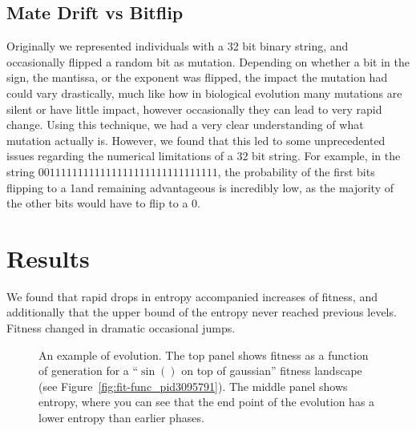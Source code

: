 \documentclass[11pt]{article}
\begin{document}
\subsection{Mate Drift vs Bitflip}
Originally we represented individuals with a 32 bit binary string, and occasionally 
flipped a random bit as mutation. Depending on whether a bit in the sign, the mantissa, 
or the exponent was flipped, the impact the mutation had could vary drastically,
much like how in biological evolution many mutations are silent or have little impact,
 however occasionally  they can lead to very rapid change. Using this technique,
 we had a very clear understanding of what mutation actually is. However, we found 
that this led to some unprecedented issues regarding the numerical limitations
of a 32 bit string. For example, in the string $0 01111111 11111111111111111111111$,
the probability of the first bits flipping to a 1and remaining advantageous is incredibly
low, as the majority of the other bits would have to flip to a 0.

\section{Results}
\label{sec:orged0917a}
We found that rapid drops in entropy accompanied increases of fitness, and
additionally that the upper bound of the entropy never reached previous levels.
Fitness changed in dramatic occasional jumps.

\begin{figure}[h]
  \centering
  \caption{An example of evolution.  The top panel shows fitness as a
    function of generation for a ``$\sin()$ on top of gaussian''
    fitness landscape (see Figure~\ref{fig:fit-func_pid3095791}).  The
    middle panel shows entropy, where you can see that the end point
    of the evolution has a lower entropy than earlier phases.}
  \label{fig:gen-info_pid3095791}
\end{figure}
\end{document}
